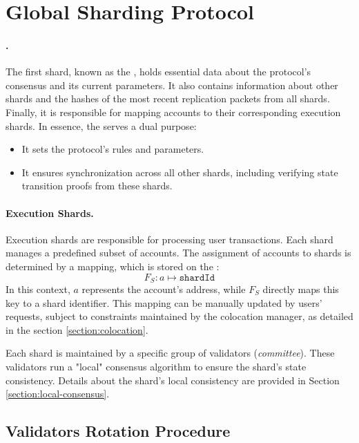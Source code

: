 \section{Global Sharding Protocol}
\label{section:sharding}

\paragraph{\mainshard.}
The first shard, known as the \mainshard, 
 holds essential data about the protocol's consensus 
 and its current parameters.
It also contains information about other shards 
 and the hashes of the most recent replication packets from all shards.
Finally, it is responsible for mapping accounts to their corresponding execution shards.
In essence, the \mainshard serves a dual purpose:
\begin{itemize}
    \item It sets the protocol's rules and parameters.
    \item It ensures synchronization across all other shards, 
     including verifying state transition proofs from these shards.
\end{itemize}


\paragraph{Execution Shards.}

Execution shards are responsible for processing user transactions.
Each shard manages a predefined subset of accounts.
The assignment of accounts to shards is determined by a mapping, which is stored on the \mainshard:
\[
    F_S: a \mapsto \texttt{shardId}
\]
In this context, $a$ represents the account's address,
 while $F_S$ directly maps this key to a shard identifier.
This mapping can be manually updated by users' requests, subject to constraints
 maintained by the colocation manager, as detailed in the section \ref{section:colocation}.

Each shard is maintained by a specific group of validators (\textit{committee}).
These validators run a "local" consensus algorithm 
 to ensure the shard's state consistency. 
Details about the shard's local consistency are provided in Section \ref{section:local-consensus}.


\subsection{Validators Rotation Procedure}
\label{setion:validators-rotation}

